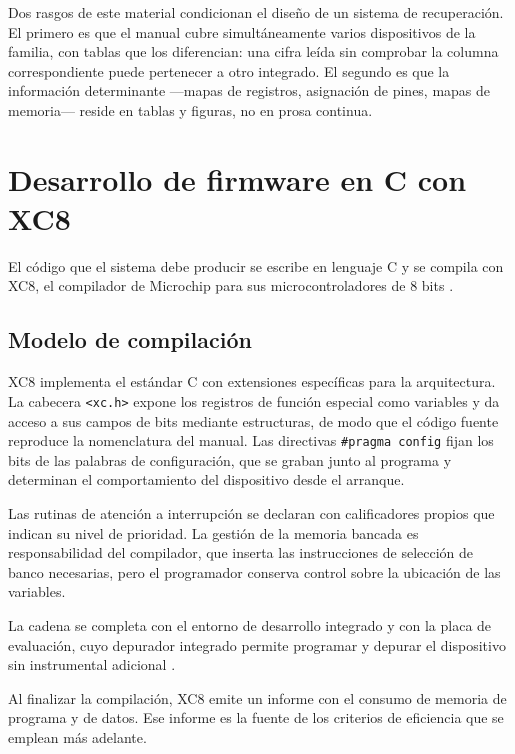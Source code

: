 Dos rasgos de este material condicionan el diseño de un sistema de recuperación.
El primero es que el manual cubre simultáneamente varios dispositivos de la
familia, con tablas que los diferencian: una cifra leída sin comprobar la
columna correspondiente puede pertenecer a otro integrado. El segundo es que la
información determinante —mapas de registros, asignación de pines, mapas de
memoria— reside en tablas y figuras, no en prosa continua.

\section{Desarrollo de firmware en C con XC8}

El código que el sistema debe producir se escribe en lenguaje C y se compila con
XC8, el compilador de Microchip para sus microcontroladores de 8 bits
\cite{microchip2012xc8}.

\subsection{Modelo de compilación}

XC8 implementa el estándar C con extensiones específicas para la arquitectura.
La cabecera \texttt{<xc.h>} expone los registros de función especial como
variables y da acceso a sus campos de bits mediante estructuras, de modo que el
código fuente reproduce la nomenclatura del manual. Las directivas
\texttt{\#pragma config} fijan los bits de las palabras de configuración, que se
graban junto al programa y determinan el comportamiento del dispositivo desde el
arranque.

Las rutinas de atención a interrupción se declaran con calificadores propios que
indican su nivel de prioridad. La gestión de la memoria bancada es
responsabilidad del compilador, que inserta las instrucciones de selección de
banco necesarias, pero el programador conserva control sobre la ubicación de las
variables.

La cadena se completa con el entorno de desarrollo integrado y con la placa de
evaluación, cuyo depurador integrado permite programar y depurar el dispositivo
sin instrumental adicional \cite{microchip2020curiosity}.

Al finalizar la compilación, XC8 emite un informe con el consumo de memoria de
programa y de datos. Ese informe es la fuente de los criterios de eficiencia que
se emplean más adelante.

